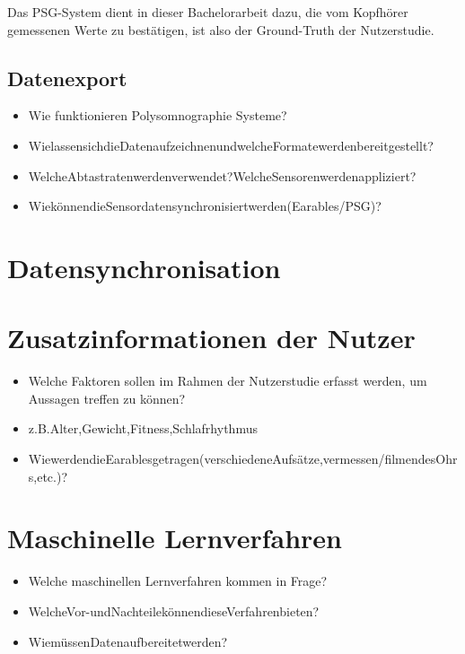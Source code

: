 
Das PSG-System dient in dieser Bachelorarbeit dazu, die vom Kopfhörer gemessenen Werte zu bestätigen, ist also der Ground-Truth der Nutzerstudie.

\subsection{Datenexport}

\begin{itemize}
    \item Wie funktionieren Polysomnographie Systeme?
    \item WielassensichdieDatenaufzeichnenundwelcheFormatewerdenbereitgestellt? 
    \item WelcheAbtastratenwerdenverwendet?WelcheSensorenwerdenappliziert?
    \item WiekönnendieSensordatensynchronisiertwerden(Earables/PSG)?
\end{itemize}

\section{Datensynchronisation}

\section{Zusatzinformationen der Nutzer}
\begin{itemize}
    \item Welche Faktoren sollen im Rahmen der Nutzerstudie erfasst werden, um Aussagen treffen zu können? 
    \item z.B.Alter,Gewicht,Fitness,Schlafrhythmus
    \item WiewerdendieEarablesgetragen(verschiedeneAufsätze,vermessen/filmendesOhrs,etc.)?
\end{itemize}


\section{Maschinelle Lernverfahren}
\begin{itemize}
    \item Welche maschinellen Lernverfahren kommen in Frage?
    \item WelcheVor-undNachteilekönnendieseVerfahrenbieten? 
    \item WiemüssenDatenaufbereitetwerden?
\end{itemize}


